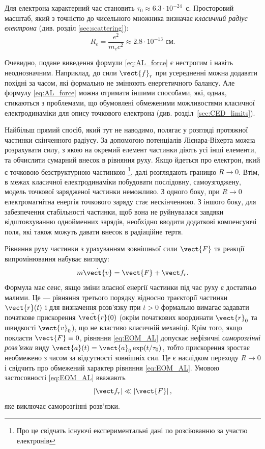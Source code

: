  Для електрона характерний час становить $\tau_0 \approx 6.3 \cdot 10^{-24}$~с. Просторовий масштаб, який з точністю до чисельного множника визначає \emph{класичний радіус електрона} (див. розділ \ref{sec:scattering}):
 \begin{equation}\label{eq:Rcl}
 R_e = \frac{e^2}{m_ec^2} \approx 2.8 \cdot 10^{-13}\text{~см}.
 \end{equation}

Очевидно, подане виведення формули \eqref{eq:AL_force}  є нестрогим і навіть  неоднозначним. Наприклад, до сили $\vect{f}_r$ при усередненні можна додавати похідні за часом, які формально не змінюють енергетичного балансу. Але формулу \eqref{eq:AL_force} можна отримати іншими способами, які, однак, стикаються з проблемами, що обумовлені обмеженими можливостями класичної електродинаміки для опису точкового електрона (див. розділ~\ref{sec:CED_limits}).

Найбільш прямий спосіб, який тут не наводимо, полягає у розгляді протяжної частинки скінченного радіусу. За допомогою потенціалів Лієнара-Віхерта можна розрахувати силу, з якою на  окремий елемент частинки діють усі інші елементи,  та обчислити сумарний внесок в рівняння руху. Якщо йдеться про електрон, який є точковою безструктурною частинкою \footnote{Про це свідчать існуючі експериментальні дані по розсіюванню за участю електронів}, далі розглядають  границю $R\to 0$. Втім, в межах класичної електродинаміки  побудовати послідовну, самоузгоджену, модель точкової зарядженої частинки неможливо. З одного боку, при $R\to 0$  електромагнітна енергія точкового заряду стає нескінченною. З іншого боку, для забезпечення стабільності частинки, щоб вона  не руйнувалася завдяки відштовхуванню однойменних зарядів, необхідно вводити додаткові компенсуючі поля, які також можуть давати внесок в радіаційне тертя.


Рівняння руху частинки з урахуванням зовнішньої сили $\vect{F}$ та реакції випромінювання набуває вигляду:
\begin{equation}\label{eq:EOM_AL}
m\dot{\vect{v}} = \vect{F} + \vect f_r.
\end{equation}
Формула має сенс, якщо зміни власної енергії частинки під час руху є достатньо малими. Це --- рівняння третього порядку відносно траєкторії частинки $\vect{r}(t)$ і для визначення розв'язку при $t>0$ формально вимагає задавати початкове прискорення  $\ddot{\vect{r}}(0)$  (окрім початкових координати $\vect{r}_0$  та швидкості $\vect{v}_0$), що не властиво класичній механіці. Крім того, якщо покласти $\vect{F}\equiv 0$, рівняння \eqref{eq:EOM_AL} допускає нефізичні
\emph{саморозгінні розв'язки} виду
$\vect{a}(t) = \vect{a}_0 \exp(t/\tau_0)$, тобто прискорення зростає необмежено з часом  за відсутності зовнішніх сил.  Це є наслідком переходу $R\to 0$ і свідчить про обмежений характер рівняння \eqref{eq:EOM_AL}. Умовою застосовності  \eqref{eq:EOM_AL} вважають
\begin{equation}\label{cond_approx}
|\vect f_r|\ll |\vect{F}| \,,
\end{equation}
яке виключає саморозгінні розв'язки.


